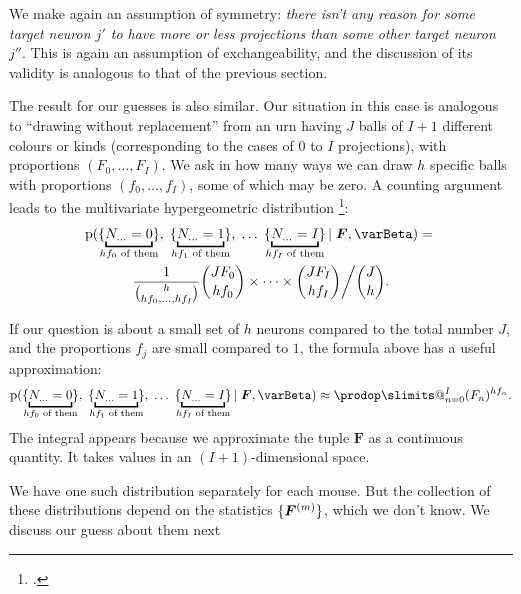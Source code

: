 \documentclass[\ifafour a4paper,12pt,\else a5paper,10pt,\fi%
onecolumn,oneside,article,%
british%
]{memoir}
\makeatletter
\theoremstyle{remark}
\theoremstyle{innote}
\def\prod{\DOTSI\prodop\slimits@}
\newcommand*{\citep}{\footcites}
\newcommand*{\di}{\mathrm{d}}%
\newcommand*{\pf}{\mathrm{p}}%
\renewcommand*{\|}[1][]{\nonscript\,#1\vert\nonscript\;\mathopen{}}
\newcommand*{\chap}{ch.}%
\newcommand*{\yI}{\varBeta}
\newcommand*{\yF}{\bm{F}}
\newcommand*{\yFm}[1][m]{\yF^{(#1)}}
\DeclarePairedDelimiter\tu{\{}{\}}
\makeatother
\begin{document}
We make again an assumption of symmetry: \emph{there isn't any reason for
  some target neuron $j'$ to have more or less projections than some other
  target neuron $j''$}. This is again an assumption of exchangeability, and
the discussion of its validity is analogous to that of the previous
section.

The result for our guesses is also similar. Our situation in this case is
analogous to \enquote{drawing without replacement} from an urn having $J$
balls of $I+1$ different colours or kinds (corresponding to the cases of
$0$ to $I$ projections), with proportions $(F_{0}, \dotsc, F_{I})$. We ask
in how many ways we can draw $h$ specific balls with proportions
$(f_{0}, \dotsc, f_{I})$, some of which may be zero. A counting argument
leads to the multivariate hypergeometric distribution
\citep[\chap~39]{johnsonetal1969_r1996}:
\begin{multline}
  \label{eq:definetti_Nj_finite}
  \pf(\tu{\underbracket{N_{\dotso}=0}_{\mathclap{\text{$hf_{0}$ of them}}}},
  \;\tu{\underbracket{N_{\dotso}=1}_{\mathclap{\text{$hf_{1}$ of them}}}},
\;\dotsc
  \;\tu{\underbracket{N_{\dotso}=I}_{\mathclap{\text{$hf_{I}$ of them}}}}
  \| \yF, \yI)
  ={}\\
  \frac{1}{\binom{h}{hf_{0},\dotsc,hf_{I}}}
  \binom{JF_{0}}{hf_{0}}\times\dotsm\times\binom{JF_{I}}{hf_{I}}\bigg/
  \binom{J}{h}.
\end{multline}

If our question is about a small set of $h$ neurons compared to the total
number $J$, and the proportions $f_{j}$ are small compared to $1$, the
formula above has a useful approximation:
\begin{equation}
  \label{eq:definetti_Nj_infinite_approx}
  \pf(\tu{\underbracket{N_{\dotso}=0}_{\mathclap{\text{$hf_{0}$ of them}}}},
  \;\tu{\underbracket{N_{\dotso}=1}_{\mathclap{\text{$hf_{1}$ of them}}}},
\;\dotsc
  \;\tu{\underbracket{N_{\dotso}=I}_{\mathclap{\text{$hf_{I}$ of them}}}}
  \| \yF, \yI)
\approx
\prod_{n=0}^{I}(F_{n})^{hf_{n}}.
\end{equation}
The integral appears because we approximate the tuple $\yF$ as a continuous
quantity. It takes values in an $(I+1)$-dimensional space.

\medskip

We have one such distribution separately for each mouse. But the collection
of these distributions depend on the statistics $\tu{\yFm}$, which we don't
know. We discuss our guess about them next
\end{document}
